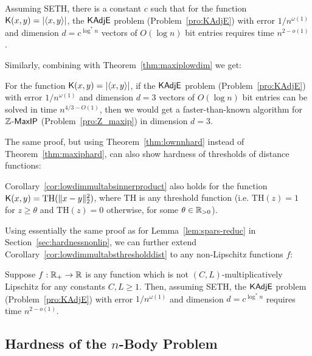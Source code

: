 \begin{corollary} \label{cor:lowdimmultabsinnerproduct}
Assuming {\sf SETH}, there is a constant $c$ such that for the function $\mathsf{K}(x,y) = |\langle x , y \rangle|$, the $\mathsf{KAdjE}$ problem (Problem~\ref{pro:KAdjE}) with error $1/n^{\omega(1)}$ and dimension $d = c^{\log^* n}$ vectors of $O(\log n)$ bit entries requires time $n^{2 - o(1)}$.
\end{corollary}

Similarly, combining with Theorem~\ref{thm:maxiplowdim} we get:

\begin{corollary}
For the function $\mathsf{K}(x,y) = |\langle x , y \rangle|$, if the $\mathsf{KAdjE}$ problem (Problem~\ref{pro:KAdjE}) with error $1/n^{\omega(1)}$ and dimension $d = 3$ vectors of $O(\log n)$ bit entries can be solved in time $n^{4/3 - O(1)}$, then we would get a faster-than-known algorithm for ${\mathbb Z}$-${\sf MaxIP}$ (Problem~\ref{pro:Z_maxip}) in dimension $d=3$.
\end{corollary}


The same proof, but using Theorem~\ref{thm:lownnhard} instead of Theorem~\ref{thm:maxiphard}, can also show hardness of thresholds of distance functions:

\begin{corollary} \label{cor:lowdimmultabsthresholddist}
Corollary~\ref{cor:lowdimmultabsinnerproduct} also holds for the function $\mathsf{K}(x,y) = \mathrm{TH}(\|x-y\|_2^2)$, where $\mathrm{TH}$ is any threshold function (i.e. $\mathrm{TH}(z) = 1$ for $z \geq \theta$ and $\mathrm{TH}(z) = 0$ otherwise, for some $\theta \in {\mathbb R}_{>0}$).
\end{corollary}

Using essentially the same proof as for Lemma~\ref{lem:spars-reduc} in Section~\ref{sec:hardnessnonlip}, we can further extend Corollary~\ref{cor:lowdimmultabsthresholddist} to any non-Lipschitz functions $f$:

\begin{proposition}\label{prop:low-mult-hard}
Suppose $f : {\mathbb R}_+ \to {\mathbb R}$ is any function which is not $(C,L)$-multiplicatively Lipschitz for any constants $C,L \geq 1$. Then, assuming {\sf SETH}, the $\mathsf{KAdjE}$ problem (Problem~\ref{pro:KAdjE}) with error $1/n^{\omega(1)}$ and dimension $d = c^{\log^* n}$ requires time $n^{2 - o(1)}$.
\end{proposition}

\subsection{Hardness of the \texorpdfstring{$n$}{}-Body Problem}

